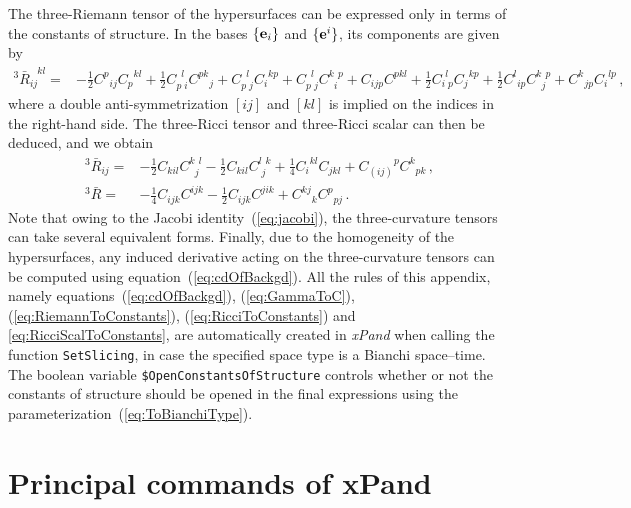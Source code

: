 \documentclass[notitlepage,onecolumn,floatfix,preprintnumbers,aps,prd,showpacs,nofootinbib,amsmath,amssymb,amsfonts]{revtex4-1}
\newcommand{\<}{\langle}
\renewcommand{\>}{\rangle}
\begin{document}
The three-Riemann tensor of the hypersurfaces can be expressed only in terms of the constants of structure. 
In the bases $\{ {\bf e}_i \}$ and $\{ {\bf e}^i \}$, its components are given by
%
\begin{align} \label{eq:RiemannToConstants}
	{}^{3}\bar R_{ij}^{\phantom{ij} kl} =
		& - \frac{1}{2}{C^p}_{ij} {C_p}^{kl} + \frac{1}{2}C_{p\phantom{l}i}^{\phantom{p}l} {C^{pk}}_j 
		+ C_{p\phantom{l}j}^{\phantom{p}l} {C_i}^{kp}
		+ C_{p\phantom{l}j}^{\phantom{p}l} C^{k\phantom{j}p}_{\phantom{k}i} 
		+ {C}_{ijp} {C}^{pkl} 
		+ \frac{1}{2}C_{i\phantom{l}p}^{\phantom{i}l} {C_j}^{kp} 
		+ \frac{1}{2}{C^l}_{ip} C^{k\phantom{j}p}_{\phantom{k}j} 
		+ {C^k}_{jp} {C_i}^{lp} \, ,
\end{align}
%
where a double anti-symmetrization $[ij]$ and $[kl]$ is implied on the indices in the right-hand
side. The three-Ricci tensor and three-Ricci scalar can then be deduced, and we obtain
\begin{align}
	{}^3\bar R_{ij} = 
		& - \frac{1}{2} C_{kil} C^{k\phantom{j}l}_{\phantom{k}j}
		- \frac{1}{2} C_{kil} C^{l\phantom{j}k}_{\phantom{l}j} 
		+ \frac{1}{4} {C_i}^{kl} C_{jkl} 
		+ {C_{(ij)}}^p {C^k}_{pk} \, , \label{eq:RicciToConstants} \\
	{}^3\bar R = 
		& - \frac{1}{4} C_{ijk}C^{ijk} 
		- \frac{1}{2} C_{ijk} C^{jik} 
		+ {C^{kj}}_k {C^p}_{pj}\, . \label{eq:RicciScalToConstants}
\end{align}
Note that owing to the Jacobi identity~(\ref{eq:jacobi}), 
the three-curvature tensors 
can take several equivalent forms. Finally, due to the homogeneity of the hypersurfaces, 
any induced derivative acting on 
the three-curvature tensors can be computed using equation~(\ref{eq:cdOfBackgd}). 
All the rules of this appendix, namely equations~(\ref{eq:cdOfBackgd}), (\ref{eq:GammaToC}), 
(\ref{eq:RiemannToConstants}), (\ref{eq:RicciToConstants}) and \eqref{eq:RicciScalToConstants}, 
are automatically created in \textit{xPand} when calling the function {\tt SetSlicing}, 
in case the specified space type is a Bianchi space--time. 
%
The boolean variable {\tt \$OpenConstantsOfStructure} controls whether or not the constants of structure should be opened 
in the final expressions using the parameterization~(\ref{eq:ToBianchiType}).


\section{Principal commands of xPand}
\end{document}
